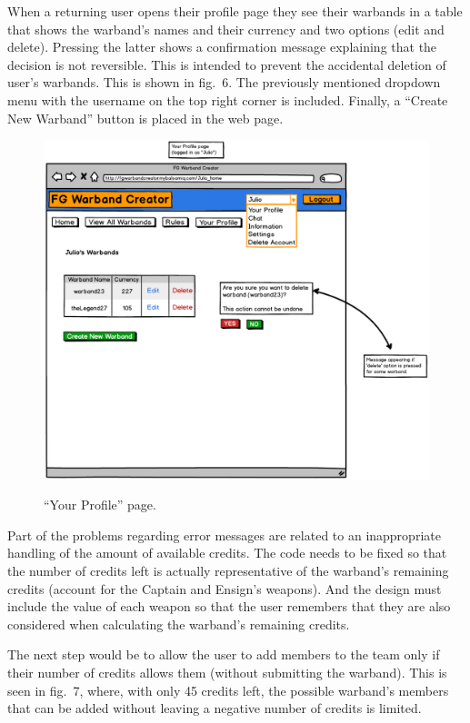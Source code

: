 \documentclass[12pt,a4paper]{article}
\begin{document}
When a returning user opens their profile page they see their warbands in a table that shows the warband's names and their currency and two options (edit and delete). Pressing the latter shows a confirmation message explaining that the decision is not reversible. This is intended to prevent the accidental deletion of user's warbands. This is shown in fig.~6. The previously mentioned dropdown menu with the username on the top right corner is included. Finally, a ``Create New Warband'' button is placed in the web page.

\begin{figure}[h!]
 \centering
 \includegraphics[width=1\textwidth]{img/profile}
 \label{fig:6}
 \caption{``Your Profile'' page.}
\end{figure}

Part of the problems regarding error messages are related to an inappropriate handling of the amount of available credits. The code needs to be fixed so that the number of credits left is actually representative of the warband's remaining credits (account for the Captain and Ensign's weapons). And the design must include the value of each weapon so that the user remembers that they are also considered when calculating the warband's remaining credits. 

The next step would be to allow the user to add members to the team only if their number of credits allows them (without submitting the warband). This is seen in fig.~7, where, with only 45 credits left, the possible warband's members that can be added without leaving a negative number of credits is limited. 
\end{document}
